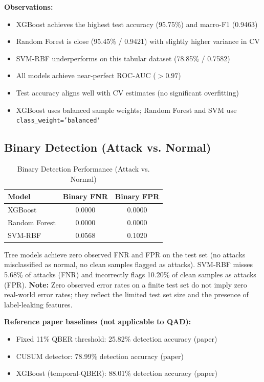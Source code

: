 \textbf{Observations:}
\begin{itemize}
    \item XGBoost achieves the highest test accuracy (95.75\%) and macro-F1 (0.9463)
    \item Random Forest is close (95.45\% / 0.9421) with slightly higher variance in CV
    \item SVM-RBF underperforms on this tabular dataset (78.85\% / 0.7582)
    \item All models achieve near-perfect ROC-AUC ($>0.97$)
    \item Test accuracy aligns well with CV estimates (no significant overfitting)
    \item XGBoost uses balanced sample weights; Random Forest and SVM use \texttt{class\_weight='balanced'}
\end{itemize}

\subsection{Binary Detection (Attack vs. Normal)}

\begin{table}[H]
\centering
\caption{Binary Detection Performance (Attack vs. Normal)}
\label{tab:binary_results}
\begin{tabular}{lcc}
\toprule
\textbf{Model} & \textbf{Binary FNR} & \textbf{Binary FPR} \\
\midrule
XGBoost & 0.0000 & 0.0000 \\
Random Forest & 0.0000 & 0.0000 \\
SVM-RBF & 0.0568 & 0.1020 \\
\bottomrule
\end{tabular}
\end{table}

Tree models achieve zero observed FNR and FPR on the test set (no attacks misclassified as normal, no clean samples flagged as attacks). SVM-RBF misses 5.68\% of attacks (FNR) and incorrectly flags 10.20\% of clean samples as attacks (FPR). \textbf{Note:} Zero observed error rates on a finite test set do not imply zero real-world error rates; they reflect the limited test set size and the presence of label-leaking features.

\textbf{Reference paper baselines (not applicable to QAD):}
\begin{itemize}
    \item Fixed 11\% QBER threshold: 25.82\% detection accuracy (paper)
    \item CUSUM detector: 78.99\% detection accuracy (paper)
    \item XGBoost (temporal-QBER): 88.01\% detection accuracy (paper)
\end{itemize}

